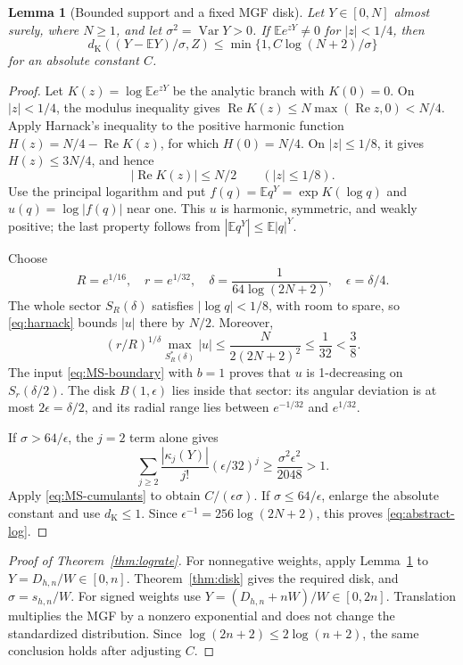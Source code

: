 \documentclass[11pt]{article}
\numberwithin{equation}{section}
\newtheorem{lemma}[theorem]{Lemma}
\theoremstyle{remark}\newtheorem{remark}[theorem]{Remark}
\newcommand{\E}{\mathbb E}\newcommand{\Pp}{\mathbb P}
\newcommand{\Var}{\operatorname{Var}}\newcommand{\ind}{\mathbf1}
\newcommand{\dK}{d_{\mathrm K}}\newcommand{\calZ}{\mathcal Z}
\begin{document}
\begin{lemma}[Bounded support and a fixed MGF disk]\label{lem:harmonic}
Let $Y\in[0,N]$ almost surely, where $N\ge1$, and let
$\sigma^2=\Var Y>0$. If $\E e^{zY}\ne0$ for $|z|<1/4$, then
\begin{equation}\label{eq:abstract-log}
 \dK((Y-\E Y)/\sigma,Z)
 \le\min\{1,C\log(N+2)/\sigma\}
\end{equation}
for an absolute constant $C$.
\end{lemma}
\begin{proof}
Let $K(z)=\log\E e^{zY}$ be the analytic branch with $K(0)=0$.
On $|z|<1/4$, the modulus inequality gives
$\operatorname{Re}K(z)\le N\max(\operatorname{Re}z,0)<N/4$.
Apply Harnack's inequality to the positive harmonic function
$H(z)=N/4-\operatorname{Re}K(z)$, for which $H(0)=N/4$.
On $|z|\le1/8$, it gives $H(z)\le3N/4$, and hence
\begin{equation}\label{eq:harnack}
 |\operatorname{Re}K(z)|\le N/2\qquad(|z|\le1/8).
\end{equation}
Use the principal logarithm and put
$f(q)=\E q^Y=\exp K(\log q)$ and $u(q)=\log|f(q)|$ near one.
This $u$ is harmonic, symmetric, and weakly positive; the last property
follows from $|\E q^Y|\le\E|q|^Y$.

Choose
\[
 R=e^{1/16},\quad r=e^{1/32},\quad
 \delta=\frac1{64\log(2N+2)},\quad \epsilon=\delta/4.
\]
The whole sector $S_R(\delta)$ satisfies $|\log q|<1/8$, with room to
spare, so \eqref{eq:harnack} bounds $|u|$ there by $N/2$. Moreover,
\[
 (r/R)^{1/\delta}\max_{S_R^*(\delta)}|u|
 \le\frac{N}{2(2N+2)^2}\le\frac1{32}<\frac38.
\]
The input \eqref{eq:MS-boundary} with $b=1$ proves that $u$ is
1-decreasing on $S_r(\delta/2)$. The disk $B(1,\epsilon)$ lies inside
that sector: its angular deviation is at most $2\epsilon=\delta/2$,
and its radial range lies between $e^{-1/32}$ and $e^{1/32}$.

If $\sigma>64/\epsilon$, the $j=2$ term alone gives
\[
 \sum_{j\ge2}\frac{|\kappa_j(Y)|}{j!}(\epsilon/32)^j
 \ge\frac{\sigma^2\epsilon^2}{2048}>1.
\]
Apply \eqref{eq:MS-cumulants} to obtain $C/(\epsilon\sigma)$.
If $\sigma\le64/\epsilon$, enlarge the absolute constant and use
$d_{\mathrm K}\le1$. Since $\epsilon^{-1}=256\log(2N+2)$, this proves
\eqref{eq:abstract-log}.
\end{proof}

\begin{proof}[Proof of Theorem~\ref{thm:lograte}]
For nonnegative weights, apply Lemma~\ref{lem:harmonic} to
$Y=D_{h,n}/W\in[0,n]$. Theorem~\ref{thm:disk} gives the required disk,
and $\sigma=s_{h,n}/W$. For signed weights use
$Y=(D_{h,n}+nW)/W\in[0,2n]$. Translation multiplies the MGF by a nonzero
exponential and does not change the standardized distribution. Since
$\log(2n+2)\le2\log(n+2)$, the same conclusion holds after adjusting $C$.
\end{proof}
\end{document}
